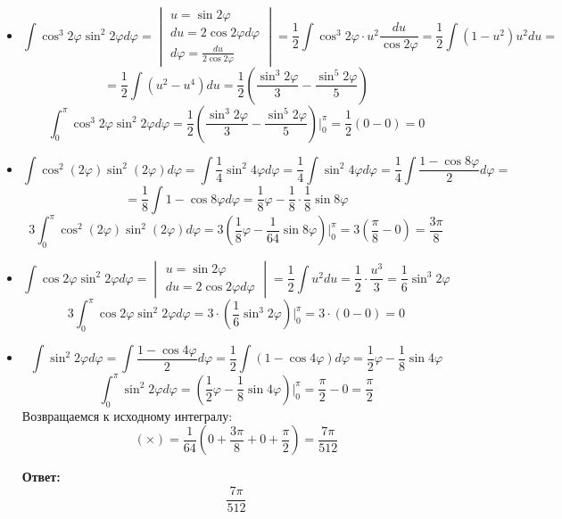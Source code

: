 \documentclass[a4paper,12pt]{article}
\begin{document}
\begin{itemize}
\item \[
\int \cos^3 2 \varphi \sin^2 2 \varphi d \varphi = \begin{vmatrix}
u = \sin 2 \varphi \\
du = 2 \cos 2 \varphi d \varphi \\
d \varphi = \frac{du}{2 \cos 2 \varphi}
\end{vmatrix} = \frac{1}{2} \int \cos^3 2 \varphi \cdot u^2 \frac{du}{\cos 2 \varphi}  = \frac{1}{2} \int  (1-u^2) u^2 du = 
\]
\[
=
\frac{1}{2 } \int (u^2 - u^4) du = \frac{1}{2} \left(\frac{\sin^3 2 \varphi}{3} - \frac{\sin^5 2 \varphi}{5}\right)
\]
\[
\int_0^{\pi} \cos^3 2 \varphi \sin^2 2 \varphi d \varphi  = \frac{1}{2} \left(\frac{\sin^3 2 \varphi}{3} - \frac{\sin^5 2 \varphi}{5}\right) \Bigg|^{\pi}_0 = \frac{1}{2}(0 - 0) = 0
\]
\item
\[
\int \cos^2 (2 \varphi) \sin^2 (2 \varphi)d \varphi = \int \frac{1}{4} \sin^2 4 \varphi d \varphi  = \frac{1}{4} \int \sin^2 4 \varphi d \varphi  = \frac{1}{4} \int \frac{1 - \cos 8 \varphi}{2} d \varphi = 
\]
\[
=
\frac{1}{8} \int 1 - \cos 8\varphi d \varphi = \frac{1}{8} \varphi - \frac{1}{8} \cdot \frac{1}{8} \sin 8 \varphi 
\]
\[
3\int_0^{\pi} \cos^2 (2 \varphi) \sin^2 (2 \varphi)d \varphi = 3 \left(\frac{1}{8} \varphi - \frac{1}{64} \sin 8 \varphi \right) \Bigg|^{\pi}_0 = 3\left(\frac{\pi}{8} - 0\right) = \frac{3\pi}{8}
\]
\item
\[
\int \cos 2 \varphi \sin^2 2 \varphi d \varphi =\begin{vmatrix}
u = \sin 2 \varphi \\
du = 2 \cos 2 \varphi d \varphi
\end{vmatrix}= \frac{1}{2} \int u^2 du = \frac{1}{2} \cdot  \frac{u^3}{3} = \frac{1}{6} \sin^3 2\varphi 
\]
\[
3\int_0^{\pi} \cos 2 \varphi \sin^2 2 \varphi d \varphi = 
3 \cdot \left( \frac{1}{6} \sin^3 2 \varphi \right)\Bigg|^{\pi}_0 = 3 \cdot (0 - 0) = 0
\]
\item
\[
\int \sin^2 2 \varphi d \varphi = \int \frac{1 - \cos 4 \varphi}{2} d \varphi  = \frac{1}{2} \int (1 - \cos 4 \varphi) d \varphi = \frac{1}{2} \varphi - \frac{1}{8} \sin 4 \varphi 
\]
\[
\int_0^{\pi} \sin^2 2 \varphi d \varphi  = \left( \frac{1}{2} \varphi - \frac{1}{8} \sin 4 \varphi \right) \Bigg|^{\pi}_0 = \frac{\pi}{2} - 0 = \frac{
\pi}{2}
\]
Возвращаемся к исходному интегралу:
\[
(\times) = \frac{1}{64} \left(0 + \frac{3\pi}{8} + 0 + \frac{\pi}{2}\right) = \frac{7\pi}{512}
\]
\begin{center}
\textbf{Ответ: } 
\[
\frac{7\pi}{512}
\]
\end{center}
\end{itemize}
\clearpage
\end{document}
